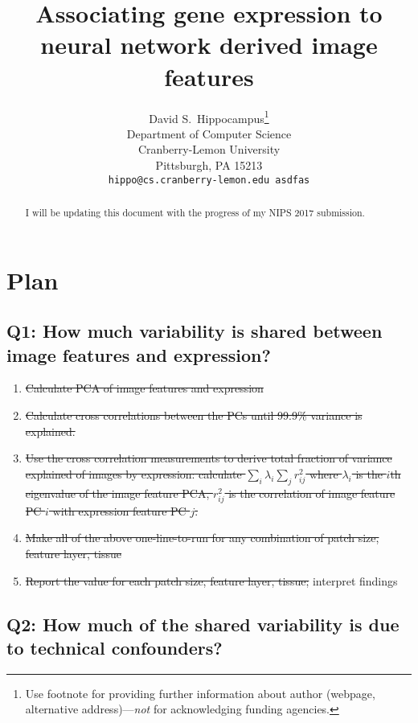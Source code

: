 \documentclass{article}
\title{Associating gene expression to neural network derived image features}
\author{
  David S.~Hippocampus\thanks{Use footnote for providing further
    information about author (webpage, alternative
    address)---\emph{not} for acknowledging funding agencies.} \\
  Department of Computer Science\\
  Cranberry-Lemon University\\
  Pittsburgh, PA 15213 \\
  \texttt{hippo@cs.cranberry-lemon.edu  asdfas} \\
}
\begin{document}

\maketitle

\begin{abstract}
I will be updating this document with the progress of  my NIPS 2017 submission.
\end{abstract}

\section*{Plan}

\subsection*{Q1: How much variability is shared between image features and expression?} 
\begin{enumerate}
\item \sout{Calculate PCA of image features and expression}

\item \sout{Calculate cross correlations between the PCs until 99.9\% variance is explained.}

\item \sout{Use the cross correlation measurements to derive total fraction of variance explained of images by expression: calculate $\sum_i \lambda_i \sum_j r^2_{ij} $ where $\lambda_i$ is the $i$th eigenvalue of the image feature PCA, $r^2_{ij}$ is the correlation of image feature PC $i$ with expression feature PC $j$.}

\item \sout{Make all of the above one-line-to-run for any combination of patch size, feature layer, tissue}

\item \sout{Report the value for each patch size, feature layer, tissue;} interpret findings

\end{enumerate}

\subsection*{Q2: How much of the shared variability is due to technical confounders?} 
\end{document}
